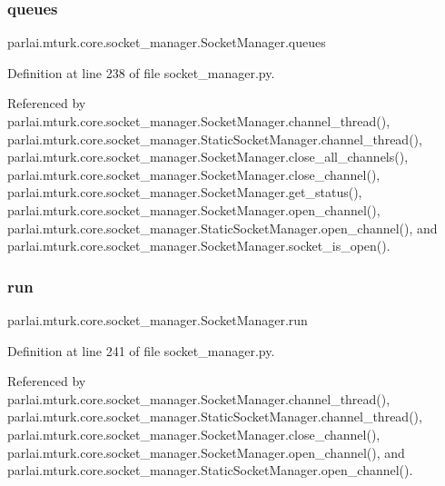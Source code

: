 \subsubsection{\texorpdfstring{queues}{queues}}
{\footnotesize\ttfamily parlai.\+mturk.\+core.\+socket\+\_\+manager.\+Socket\+Manager.\+queues}



Definition at line 238 of file socket\+\_\+manager.\+py.



Referenced by parlai.\+mturk.\+core.\+socket\+\_\+manager.\+Socket\+Manager.\+channel\+\_\+thread(), parlai.\+mturk.\+core.\+socket\+\_\+manager.\+Static\+Socket\+Manager.\+channel\+\_\+thread(), parlai.\+mturk.\+core.\+socket\+\_\+manager.\+Socket\+Manager.\+close\+\_\+all\+\_\+channels(), parlai.\+mturk.\+core.\+socket\+\_\+manager.\+Socket\+Manager.\+close\+\_\+channel(), parlai.\+mturk.\+core.\+socket\+\_\+manager.\+Socket\+Manager.\+get\+\_\+status(), parlai.\+mturk.\+core.\+socket\+\_\+manager.\+Socket\+Manager.\+open\+\_\+channel(), parlai.\+mturk.\+core.\+socket\+\_\+manager.\+Static\+Socket\+Manager.\+open\+\_\+channel(), and parlai.\+mturk.\+core.\+socket\+\_\+manager.\+Socket\+Manager.\+socket\+\_\+is\+\_\+open().

\mbox{\label{classparlai_1_1mturk_1_1core_1_1socket__manager_1_1SocketManager_aba446fa424239c0b11d19718294e2218}} 
\subsubsection{\texorpdfstring{run}{run}}
{\footnotesize\ttfamily parlai.\+mturk.\+core.\+socket\+\_\+manager.\+Socket\+Manager.\+run}



Definition at line 241 of file socket\+\_\+manager.\+py.



Referenced by parlai.\+mturk.\+core.\+socket\+\_\+manager.\+Socket\+Manager.\+channel\+\_\+thread(), parlai.\+mturk.\+core.\+socket\+\_\+manager.\+Static\+Socket\+Manager.\+channel\+\_\+thread(), parlai.\+mturk.\+core.\+socket\+\_\+manager.\+Socket\+Manager.\+close\+\_\+channel(), parlai.\+mturk.\+core.\+socket\+\_\+manager.\+Socket\+Manager.\+open\+\_\+channel(), and parlai.\+mturk.\+core.\+socket\+\_\+manager.\+Static\+Socket\+Manager.\+open\+\_\+channel().

